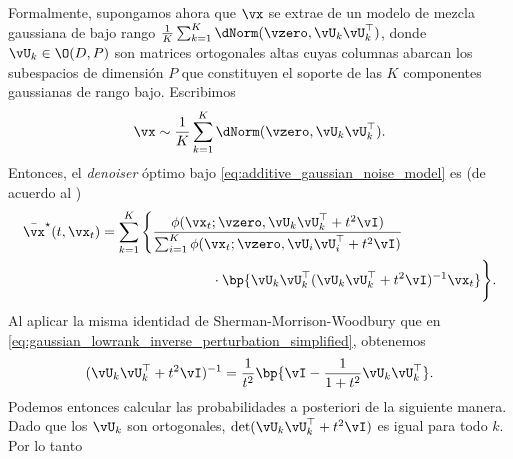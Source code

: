 \documentclass[../../book-main.tex]{subfiles}
\begin{document}
Formalmente, supongamos ahora que \(\vx\) se extrae de un modelo de mezcla gaussiana de bajo rango
\(\frac{1}{K}\sum_{k = 1}^{K}\dNorm(\vzero,
\vU_{k}\vU_{k}^{\top})\), donde \(\vU_{k} \in \O(D, P)\) son matrices ortogonales altas
cuyas columnas abarcan los subespacios de dimensión \(P\)
que constituyen el soporte de las \(K\) componentes gaussianas de rango bajo. Escribimos
\begin{equation}\label{eq:MoG1}
    \vx \sim \frac{1}{K}\sum_{k = 1}^{K}\dNorm(\vzero, \vU_{k}\vU_{k}^{\top}).
\end{equation}
Entonces, el \textit{denoiser} óptimo bajo
\eqref{eq:additive_gaussian_noise_model} es (de acuerdo
al )
\begin{align}
    \bar{\vx}^{\star}(t, \vx_{t})
    &= \sum_{k = 1}^{K}\Bigg\{\frac{\phi(\vx_{t} ; \vzero,
        \vU_{k}\vU_{k}^{\top} + t^{2}\vI)}{\sum_{i = 1}^{K}\phi(\vx_{t} ;
                \vzero, \vU_{i}\vU_{i}^{\top} +
        t^{2}\vI)} \\
        &\qquad \qquad \qquad \qquad
        \cdot\bp{\vU_{k}\vU_{k}^{\top}(\vU_{k}\vU_{k}^{\top} +
    t^{2}\vI)^{-1}\vx_{t}}\Bigg\}.
\end{align}
Al aplicar la misma identidad de Sherman-Morrison-Woodbury que en
\eqref{eq:gaussian_lowrank_inverse_perturbation_simplified}, obtenemos
\begin{equation}
    (\vU_{k}\vU_{k}^{\top} + t^{2}\vI)^{-1} = \frac{1}{t^{2}}\bp{\vI
    - \frac{1}{1 + t^{2}}\vU_{k}\vU_{k}^{\top}}.
\end{equation}
Podemos entonces calcular las probabilidades a posteriori de la siguiente manera. Dado que los
\(\vU_{k}\) son ortogonales, \(\det(\vU_{k}\vU_{k}^{\top}
+ t^{2}\vI)\) es igual para todo \(k\). Por lo tanto
\end{document}
